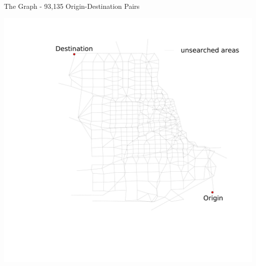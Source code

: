 \documentclass{beamer}
\begin{document}

\begin{frame}[shrink]{The Graph - 93,135 Origin-Destination Pairs}
    \begin{center}
        \includegraphics[page=1,width=\paperwidth, height=\paperheight, keepaspectratio,trim=0 120px 48px 120px,clip]{img/chicago_dijkstra_animation}
    \end{center}
\end{frame}
\end{document}
